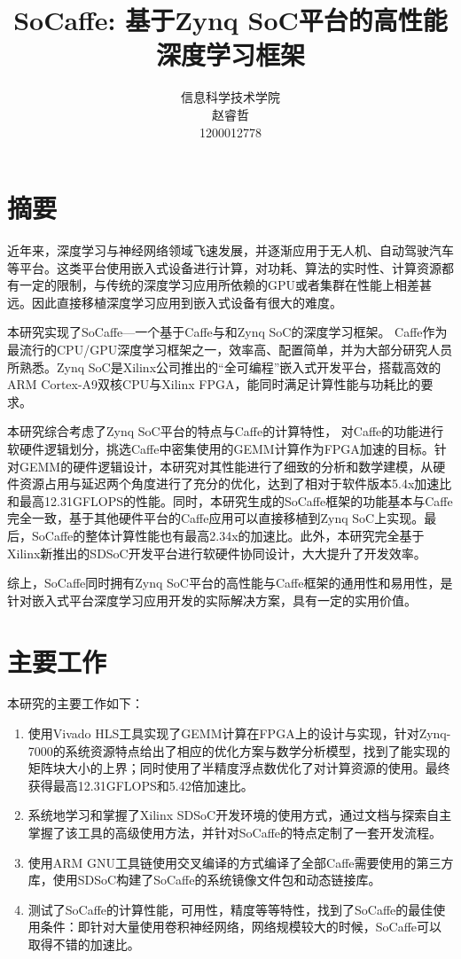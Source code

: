 \documentclass[a4paper, 12pt]{article}
\begin{document}
\title{{\Large SoCaffe: 基于Zynq SoC平台的高性能深度学习框架}}
\author{{\large 信息科学技术学院}\\{\large 赵睿哲}\\{\large 1200012778}}
\date{}
\maketitle

\section{摘要}
近年来，深度学习与神经网络领域飞速发展，并逐渐应用于无人机、自动驾驶汽车等平台。这类平台使用嵌入式设备进行计算，对功耗、算法的实时性、计算资源都有一定的限制，与传统的深度学习应用所依赖的GPU或者集群在性能上相差甚远。因此直接移植深度学习应用到嵌入式设备有很大的难度。

本研究实现了SoCaffe—一个基于Caffe与和Zynq SoC的深度学习框架。
Caffe作为最流行的CPU/GPU深度学习框架之一，效率高、配置简单，并为大部分研究人员所熟悉。Zynq SoC是Xilinx公司推出的“全可编程”嵌入式开发平台，搭载高效的ARM Cortex-A9双核CPU与Xilinx FPGA，能同时满足计算性能与功耗比的要求。

本研究综合考虑了Zynq SoC平台的特点与Caffe的计算特性，
对Caffe的功能进行软硬件逻辑划分，挑选Caffe中密集使用的GEMM计算作为FPGA加速的目标。针对GEMM的硬件逻辑设计，本研究对其性能进行了细致的分析和数学建模，从硬件资源占用与延迟两个角度进行了充分的优化，达到了相对于软件版本5.4x加速比和最高12.31GFLOPS的性能。同时，本研究生成的SoCaffe框架的功能基本与Caffe完全一致，基于其他硬件平台的Caffe应用可以直接移植到Zynq SoC上实现。最后，SoCaffe的整体计算性能也有最高2.34x的加速比。此外，本研究完全基于Xilinx新推出的SDSoC开发平台进行软硬件协同设计，大大提升了开发效率。

综上，SoCaffe同时拥有Zynq SoC平台的高性能与Caffe框架的通用性和易用性，是针对嵌入式平台深度学习应用开发的实际解决方案，具有一定的实用价值。

\section{主要工作}
本研究的主要工作如下：
\begin{enumerate}
	\item 使用Vivado HLS工具实现了GEMM计算在FPGA上的设计与实现，针对Zynq-7000的系统资源特点给出了相应的优化方案与数学分析模型，找到了能实现的矩阵块大小的上界；同时使用了半精度浮点数优化了对计算资源的使用。最终获得最高12.31GFLOPS和5.42倍加速比。
	\item 系统地学习和掌握了Xilinx SDSoC开发环境的使用方式，通过文档与探索自主掌握了该工具的高级使用方法，并针对SoCaffe的特点定制了一套开发流程。
	\item 使用ARM GNU工具链使用交叉编译的方式编译了全部Caffe需要使用的第三方库，使用SDSoC构建了SoCaffe的系统镜像文件包和动态链接库。
	\item 测试了SoCaffe的计算性能，可用性，精度等等特性，找到了SoCaffe的最佳使用条件：即针对大量使用卷积神经网络，网络规模较大的时候，SoCaffe可以取得不错的加速比。
\end{enumerate}
\end{document}

